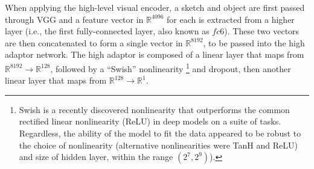 \documentclass[9pt,twocolumn,twoside]{pnas-new}
\begin{document}
{%


When applying the high-level visual encoder, a sketch and object are first passed through VGG and a feature vector in $\mathbb{R}^{4096}$ for each is extracted from a higher layer (i.e., the first fully-connected layer, also known as $fc6$). These two vectors are then concatenated to form a single vector in $\mathbb{R}^{8192}$, to be passed into the high adaptor network. 
The high adaptor is composed of a linear layer that maps from $\mathbb{R}^{8192} \rightarrow \mathbb{R}^{128}$, followed by a ``Swish'' nonlinearity \footnote{Swish is a recently discovered nonlinearity that outperforms the common rectified linear nonlinearity (ReLU) in deep models on a suite of tasks. Regardless, the ability of the model to fit the data appeared to be robust to the choice of nonlinearity (alternative nonlinearities were TanH and ReLU) and size of hidden layer, within the range $(2^{7},2^{9})$).} \cite[]{ramachandran2018searching} and dropout, then another linear layer that maps from $\mathbb{R}^{128} \rightarrow \mathbb{R}^{1}$.

}
\end{document}
